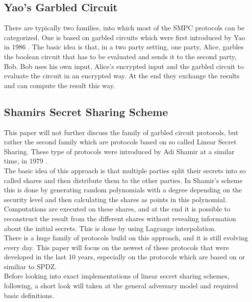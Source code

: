 \documentclass[english,runningheads,a4paper]{llncs}[2018/03/10]
\begin{document}
\subsection{Yao's Garbled Circuit}
There are typically two families, into which most of the SMPC protocols can be categorized. One is based on garbled circuits which were first introduced by Yao in 1986 \cite{4568207}. The basic idea is that, in a two party setting, one party, Alice, garbles the boolean circuit that has to be evaluated and sends it to the second party, Bob. Bob uses his own input, Alice's encrypted input and the garbled circuit to evaluate the circuit in an encrypted way. At the end they exchange the results and can compute the result this way. 

\subsection{Shamirs Secret Sharing Scheme}
This paper will not further discuss the family of garbled circuit protocols, but rather the second family which are protocols based on so called Linear Secret Sharing. 
These type of protocols were introduced by Adi Shamir at a similar time, in 1979 \cite{Shamir:1979:SS:359168.359176}.\\
The basic idea of this approach is that multiple parties split their secrets into so called shares and then distribute them to the other parties. In Shamir's scheme this is done by generating random polynomials with a degree depending on the security level and then calculating the shares as points in this polynomial. Computations are executed on these shares, and at the end it is possible to reconstruct the result from the different shares without revealing information about the initial secrets. This is done by using Lagrange interpolation.\\
 There is a huge family of protocols build on this approach, and it is still evolving every day. This paper will focus on the newest of these protocols that were developed in the last 10 years, especially on the protocols which are based on or similiar to SPDZ.\\

Before looking into exact implementations of linear secret sharing schemes, following, a short look will taken at the general adversary model and required basic definitions.
\end{document}
